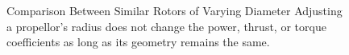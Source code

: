 \documentclass{article}
\begin{document}
\begin{figure}
  \label{fig:3}
  \centering
  \caption{Comparison Between Similar Rotors of Varying Diameter \newline Adjusting a propellor's radius does not change the power, thrust, or torque coefficients as long as its geometry remains the same.}
\end{figure}
\end{document}
